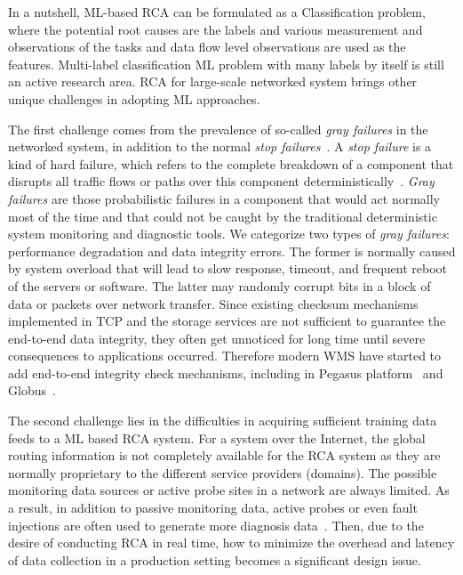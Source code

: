In a nutshell, ML-based RCA can be formulated as a Classification problem, where the potential root causes are the labels and various 
measurement and observations of the tasks and data flow level observations are used as the features. Multi-label classification ML problem with many labels by itself is still an active research area.
RCA for large-scale networked system brings other unique challenges in adopting ML approaches.
 
The first challenge comes from the prevalence of so-called {\it gray failures} in the networked system, in addition to the normal {\it stop failures}~\cite{GrayFailure:2017,DeepView:NSDI18}. A {\it stop failure} is a kind of hard failure, which refers to the complete breakdown of a component that disrupts all traffic flows or paths over this component deterministically~\cite{Link-JIoT-2019}. {\it Gray failures} are those probabilistic failures in a component that would act normally most of the time and that could not be caught by the traditional deterministic system monitoring and diagnostic tools. We categorize two types of  {\it gray failures}: performance degradation and data integrity errors. The former is normally caused by system overload that will lead to slow response, timeout, and frequent reboot of the servers or software. The latter may randomly corrupt bits in a block of data or packets over network transfer. Since existing checksum mechanisms implemented in TCP and the storage services are not sufficient to guarantee the end-to-end data integrity, they often get unnoticed for long time until severe consequences to applications occurred. Therefore modern WMS have started to add end-to-end integrity check mechanisms, including in Pegasus platform~\cite{swip:pearc:2019} and Globus~\cite{IntegrityVerification:DataTransfer}.

The second challenge lies in the difficulties in acquiring sufficient training data feeds to a ML based RCA system. For a system over the Internet, the global routing information is not completely available for the RCA system as they are normally proprietary to the different service providers (domains). The possible monitoring data sources or active probe sites in a network are always limited. As a result, in addition to passive monitoring data, active probes or even fault injections are often used to generate more diagnosis data~\cite{active:iot:2019, NetPoirot:Sigcomm2016}. Then, due to the desire of conducting RCA in real time, how to minimize the overhead and latency of data collection in a production setting becomes a significant design issue.


